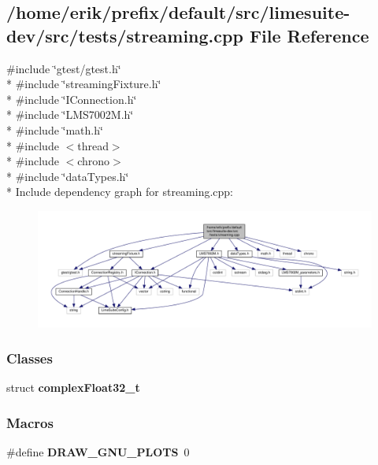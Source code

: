 \subsection{/home/erik/prefix/default/src/limesuite-\/dev/src/tests/streaming.cpp File Reference}
\label{streaming_8cpp}
{\ttfamily \#include \char`\"{}gtest/gtest.\+h\char`\"{}}\\*
{\ttfamily \#include \char`\"{}streaming\+Fixture.\+h\char`\"{}}\\*
{\ttfamily \#include \char`\"{}I\+Connection.\+h\char`\"{}}\\*
{\ttfamily \#include \char`\"{}L\+M\+S7002\+M.\+h\char`\"{}}\\*
{\ttfamily \#include \char`\"{}math.\+h\char`\"{}}\\*
{\ttfamily \#include $<$thread$>$}\\*
{\ttfamily \#include $<$chrono$>$}\\*
{\ttfamily \#include \char`\"{}data\+Types.\+h\char`\"{}}\\*
Include dependency graph for streaming.\+cpp\+:
\nopagebreak
\begin{figure}[H]
\begin{center}
\leavevmode
\includegraphics[width=350pt]{d3/dff/streaming_8cpp__incl}
\end{center}
\end{figure}
\subsubsection*{Classes}
\begin{DoxyCompactItemize}
\item 
struct {\bf complex\+Float32\+\_\+t}
\end{DoxyCompactItemize}
\subsubsection*{Macros}
\begin{DoxyCompactItemize}
\item 
\#define {\bf D\+R\+A\+W\+\_\+\+G\+N\+U\+\_\+\+P\+L\+O\+TS}~0
\end{DoxyCompactItemize}
